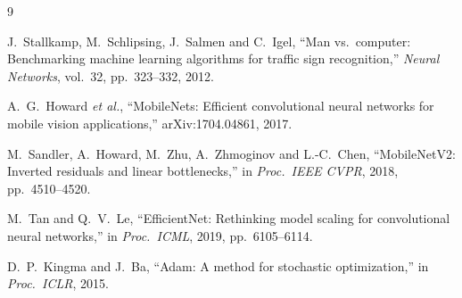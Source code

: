\documentclass[11pt, a4paper]{article}
\begin{document}
\begin{thebibliography}{9}

J.~Stallkamp, M.~Schlipsing, J.~Salmen and C.~Igel, ``Man vs.\ computer: Benchmarking machine learning algorithms
for traffic sign recognition,'' \emph{Neural Networks}, vol.~32, pp.~323--332, 2012.

A.~G.~Howard \emph{et al.}, ``MobileNets: Efficient convolutional neural networks for mobile vision applications,''
arXiv:1704.04861, 2017.

M.~Sandler, A.~Howard, M.~Zhu, A.~Zhmoginov and L.-C.~Chen, ``MobileNetV2: Inverted residuals and linear
bottlenecks,'' in \emph{Proc.\ IEEE CVPR}, 2018, pp.~4510--4520.

M.~Tan and Q.~V.~Le, ``EfficientNet: Rethinking model scaling for convolutional neural networks,'' in
\emph{Proc.\ ICML}, 2019, pp.~6105--6114.

D.~P.~Kingma and J.~Ba, ``Adam: A method for stochastic optimization,'' in \emph{Proc.\ ICLR}, 2015.

\end{thebibliography}
\end{document}
